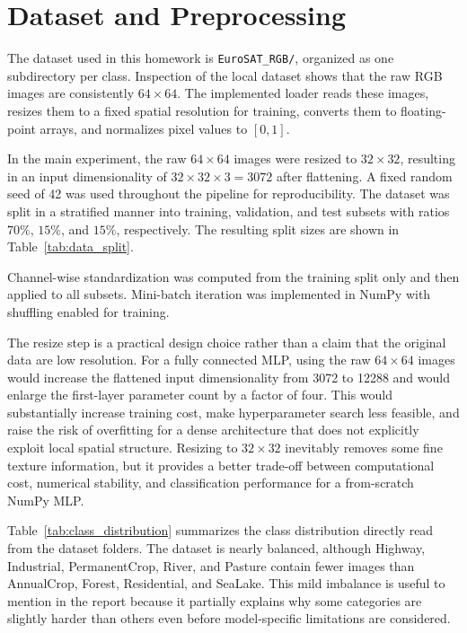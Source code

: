\documentclass{article}
\begin{document}
\section{Dataset and Preprocessing}

The dataset used in this homework is \texttt{EuroSAT\_RGB/}, organized as one subdirectory per class. Inspection of the local dataset shows that the raw RGB images are consistently \(64 \times 64\). The implemented loader reads these images, resizes them to a fixed spatial resolution for training, converts them to floating-point arrays, and normalizes pixel values to \([0, 1]\).

In the main experiment, the raw \(64 \times 64\) images were resized to \(32 \times 32\), resulting in an input dimensionality of \(32 \times 32 \times 3 = 3072\) after flattening. A fixed random seed of 42 was used throughout the pipeline for reproducibility. The dataset was split in a stratified manner into training, validation, and test subsets with ratios \(70\%\), \(15\%\), and \(15\%\), respectively. The resulting split sizes are shown in Table~\ref{tab:data_split}.

Channel-wise standardization was computed from the training split only and then applied to all subsets. Mini-batch iteration was implemented in NumPy with shuffling enabled for training.

The resize step is a practical design choice rather than a claim that the original data are low resolution. For a fully connected MLP, using the raw \(64 \times 64\) images would increase the flattened input dimensionality from 3072 to 12288 and would enlarge the first-layer parameter count by a factor of four. This would substantially increase training cost, make hyperparameter search less feasible, and raise the risk of overfitting for a dense architecture that does not explicitly exploit local spatial structure. Resizing to \(32 \times 32\) inevitably removes some fine texture information, but it provides a better trade-off between computational cost, numerical stability, and classification performance for a from-scratch NumPy MLP.

Table~\ref{tab:class_distribution} summarizes the class distribution directly read from the dataset folders. The dataset is nearly balanced, although Highway, Industrial, PermanentCrop, River, and Pasture contain fewer images than AnnualCrop, Forest, Residential, and SeaLake. This mild imbalance is useful to mention in the report because it partially explains why some categories are slightly harder than others even before model-specific limitations are considered.
\end{document}
